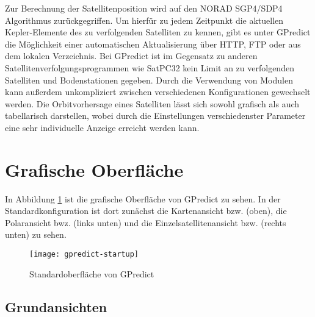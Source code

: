 \clearpage

Zur Berechnung der Satellitenposition wird auf den NORAD SGP4/SDP4 Algorithmus zurückgegriffen. Um hierfür zu jedem Zeitpunkt die aktuellen Kepler-Elemente des zu verfolgenden Satelliten zu kennen, gibt es unter GPredict die Möglichkeit einer automatischen Aktualisierung über HTTP, FTP oder aus dem lokalen Verzeichnis.\newpar
Bei GPredict ist im Gegensatz zu anderen Satellitenverfolgungsprogrammen wie SatPC32 kein Limit an zu verfolgenden Satelliten und Bodenstationen gegeben. Durch die Verwendung von Modulen kann außerdem unkompliziert zwischen verschiedenen Konfigurationen gewechselt werden. Die Orbitvorhersage eines Satelliten lässt sich sowohl grafisch als auch tabellarisch darstellen, wobei durch die Einstellungen verschiedenster Parameter eine sehr individuelle Anzeige erreicht werden kann.

\section{Grafische Oberfläche}

In Abbildung \ref{fig:gpredictstartup} ist die grafische Oberfläche von GPredict zu sehen. In der Standardkonfiguration ist dort zunächst die Kartenansicht bzw.  (oben), die Polaransicht bwz.  (links unten) und die Einzelsatellitenansicht bzw.  (rechts unten) zu sehen.

\begin{figure}[h]
	\centering
	\texttt{[image: gpredict-startup]}
	\caption{Standardoberfläche von GPredict}
	\label{fig:gpredictstartup} 
\end{figure}

\clearpage

\subsection{Grundansichten}

